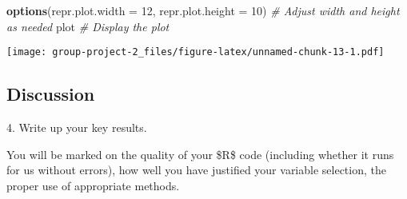 \documentclass[
]{article}
\newenvironment{Shaded}{\begin{snugshade}}{\end{snugshade}}
\newcommand{\AttributeTok}[1]{\textcolor[rgb]{0.13,0.29,0.53}{#1}}
\newcommand{\CommentTok}[1]{\textcolor[rgb]{0.56,0.35,0.01}{\textit{#1}}}
\newcommand{\DecValTok}[1]{\textcolor[rgb]{0.00,0.00,0.81}{#1}}
\newcommand{\FunctionTok}[1]{\textcolor[rgb]{0.13,0.29,0.53}{\textbf{#1}}}
\newcommand{\NormalTok}[1]{#1}
\begin{document}
\begin{Shaded}
\begin{Highlighting}[]
\FunctionTok{options}\NormalTok{(}\AttributeTok{repr.plot.width =} \DecValTok{12}\NormalTok{, }\AttributeTok{repr.plot.height =} \DecValTok{10}\NormalTok{)  }\CommentTok{\# Adjust width and height as needed}
\NormalTok{plot  }\CommentTok{\# Display the plot}
\end{Highlighting}
\end{Shaded}

\texttt{[image: group-project-2\_files/figure-latex/unnamed-chunk-13-1.pdf]}

\hypertarget{discussion}{%
\subsection{Discussion}\label{discussion}}

4. Write up your key results.

You will be marked on the quality of your \$R\$ code (including whether
it runs for us without errors), how well you have justified your
variable selection, the proper use of appropriate methods.
\end{document}
